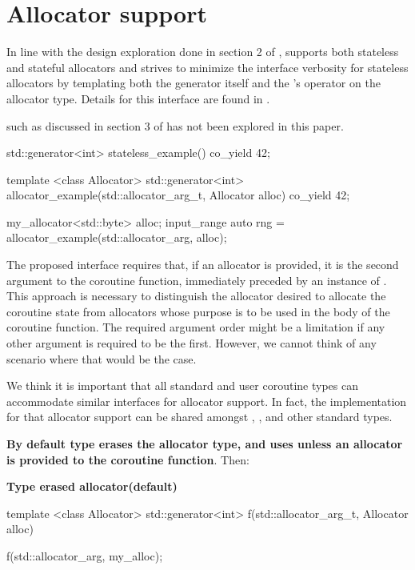 \documentclass{wg21}
\begin{document}
\section{Allocator support}

In line with the design exploration done in section 2 of ,  supports both stateless and stateful allocators and strives to minimize the interface verbosity for stateless allocators by templating both the generator itself and the 's  operator
on the allocator type. Details for this interface are found in .

 such as discussed in section 3 of  has not been explored in this paper.

\begin{colorblock}
    std::generator<int> stateless_example() {
        co_yield 42;
    }

    template <class Allocator>
    std::generator<int> allocator_example(std::allocator_arg_t, Allocator alloc) {
        co_yield 42;
    }

    my_allocator<std::byte> alloc;
    input_range auto rng = allocator_example(std::allocator_arg, alloc);
\end{colorblock}

The proposed interface requires that, if an allocator is provided, it is the second argument to the coroutine function,
immediately preceded by an instance of .
This approach is necessary to distinguish the allocator desired to allocate the coroutine state from allocators whose purpose is to be used in the body of the coroutine function.
The required argument order might be a limitation if any other argument is required to be the first. However, we cannot think of any scenario where that would be the case.

We think it is important that all standard and user coroutine types can accommodate similar interfaces for allocator support.
In fact, the implementation for that allocator support can be shared amongst , , and other standard types.

\textbf{By default  type erases the allocator type, and uses  unless an allocator is provided to
the coroutine function}.
Then:

\textbf{Type erased allocator(default)}

\begin{colorblock}
template <class Allocator>
std::generator<int> f(std::allocator_arg_t, Allocator alloc) {}

f(std::allocator_arg, my_alloc{});
\end{colorblock}
\end{document}
